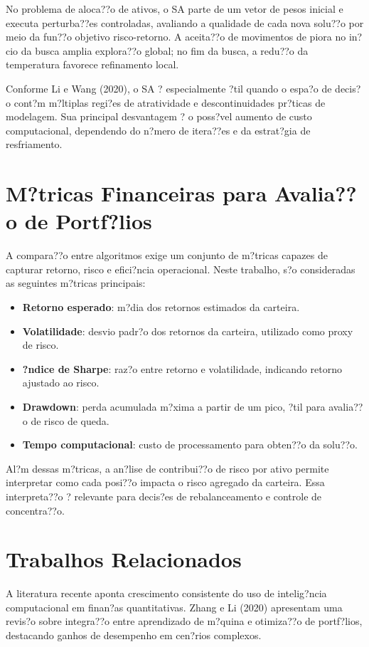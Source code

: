 ﻿\documentclass[
  12pt,
  oneside,
  a4paper,
  brazil
]{abntex2}
\begin{document}
No problema de aloca??o de ativos, o SA parte de um vetor de pesos inicial e executa perturba??es controladas, avaliando a qualidade de cada nova solu??o por meio da fun??o objetivo risco-retorno. A aceita??o de movimentos de piora no in?cio da busca amplia explora??o global; no fim da busca, a redu??o da temperatura favorece refinamento local.

Conforme Li e Wang (2020), o SA ? especialmente ?til quando o espa?o de decis?o cont?m m?ltiplas regi?es de atratividade e descontinuidades pr?ticas de modelagem. Sua principal desvantagem ? o poss?vel aumento de custo computacional, dependendo do n?mero de itera??es e da estrat?gia de resfriamento.

\section{M?tricas Financeiras para Avalia??o de Portf?lios}
A compara??o entre algoritmos exige um conjunto de m?tricas capazes de capturar retorno, risco e efici?ncia operacional. Neste trabalho, s?o consideradas as seguintes m?tricas principais:
\begin{itemize}
  \item \textbf{Retorno esperado}: m?dia dos retornos estimados da carteira.
  \item \textbf{Volatilidade}: desvio padr?o dos retornos da carteira, utilizado como proxy de risco.
  \item \textbf{?ndice de Sharpe}: raz?o entre retorno e volatilidade, indicando retorno ajustado ao risco.
  \item \textbf{Drawdown}: perda acumulada m?xima a partir de um pico, ?til para avalia??o de risco de queda.
  \item \textbf{Tempo computacional}: custo de processamento para obten??o da solu??o.
\end{itemize}

Al?m dessas m?tricas, a an?lise de contribui??o de risco por ativo permite interpretar como cada posi??o impacta o risco agregado da carteira. Essa interpreta??o ? relevante para decis?es de rebalanceamento e controle de concentra??o.

\section{Trabalhos Relacionados}
A literatura recente aponta crescimento consistente do uso de intelig?ncia computacional em finan?as quantitativas. Zhang e Li (2020) apresentam uma revis?o sobre integra??o entre aprendizado de m?quina e otimiza??o de portf?lios, destacando ganhos de desempenho em cen?rios complexos.
\end{document}
